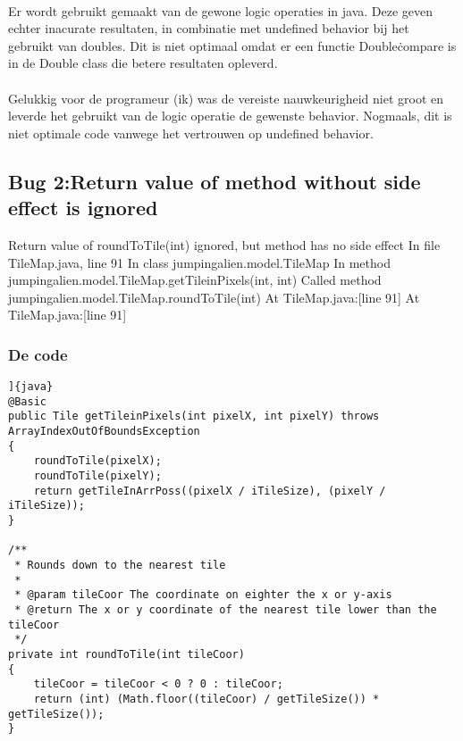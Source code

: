 \documentclass[a4paper]{article}
\begin{document}
\paragraph{}

Er wordt gebruikt gemaakt van de gewone logic operaties in java. Deze geven echter inacurate resultaten, in combinatie met undefined behavior bij het gebruikt van doubles.
Dit is niet optimaal omdat er een functie Double\.compare is in de Double class die betere resultaten opleverd.
\paragraph{}

Gelukkig voor de programeur (ik) was de vereiste nauwkeurigheid niet groot en leverde het gebruikt van de logic operatie de gewenste behavior.
Nogmaals, dit is niet optimale code vanwege het vertrouwen op undefined behavior.

\subsection{Bug 2:Return value of method without side effect is ignored}
Return value of roundToTile(int) ignored, but method has no side effect
   In file TileMap.java, line 91
   In class jumpingalien.model.TileMap
   In method jumpingalien.model.TileMap.getTileinPixels(int, int)
   Called method jumpingalien.model.TileMap.roundToTile(int)
   At TileMap.java:[line 91]
   At TileMap.java:[line 91]
\subsubsection{De code}
\begin{verbatim}]{java}
@Basic
public Tile getTileinPixels(int pixelX, int pixelY) throws ArrayIndexOutOfBoundsException
{
	roundToTile(pixelX);
	roundToTile(pixelY);
	return getTileInArrPoss((pixelX / iTileSize), (pixelY / iTileSize));
}

/**
 * Rounds down to the nearest tile
 *
 * @param tileCoor The coordinate on eighter the x or y-axis
 * @return The x or y coordinate of the nearest tile lower than the tileCoor
 */
private int roundToTile(int tileCoor)
{
	tileCoor = tileCoor < 0 ? 0 : tileCoor;
	return (int) (Math.floor((tileCoor) / getTileSize()) * getTileSize());
}
\end{verbatim}
\end{document}
